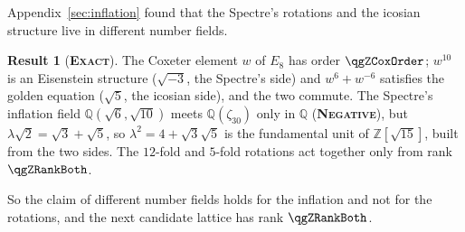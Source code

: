 \documentclass[11pt]{article}
\newcommand{\exact}{\textbf{\textsc{Exact}}}
\newcommand{\negres}{\textbf{\textsc{Negative}}}
\theoremstyle{definition}
\newtheorem{result}{Result}
\begin{document}
Appendix~\ref{sec:inflation} found that the Spectre's rotations and the icosian structure live in different number fields.
\begin{result}[\exact]\label{res:toward-fields}
The Coxeter element $w$ of $E_8$ has order $\qgZCoxOrder$; $w^{10}$ is an Eisenstein structure ($\sqrt{-3}$, the Spectre's side) and $w^6+w^{-6}$ satisfies the golden equation ($\sqrt5$, the icosian side), and the two commute. The Spectre's inflation field $\mathbb{Q}(\sqrt6,\sqrt{10})$ meets $\mathbb{Q}(\zeta_{30})$ only in $\mathbb{Q}$ (\negres), but $\lambda\sqrt2=\sqrt3+\sqrt5$, so $\lambda^2=4+\sqrt3\sqrt5$ is the fundamental unit of $\mathbb{Z}[\sqrt{15}]$, built from the two sides. The $12$-fold and $5$-fold rotations act together only from rank $\qgZRankBoth$.
\end{result}
So the claim of different number fields holds for the inflation and not for the rotations, and the next candidate lattice has rank $\qgZRankBoth$.
\end{document}
